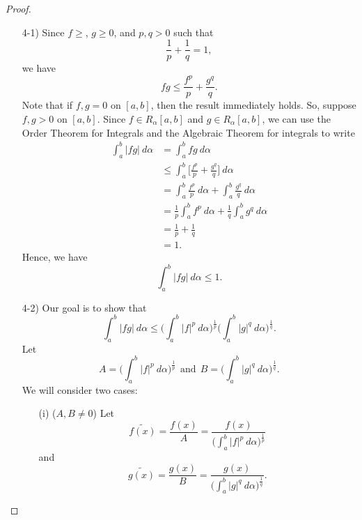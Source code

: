 \documentclass[a4paper]{article}
\begin{document}
\begin{proof}
\begin{enumerate}
    \item[4-1)] Since \( f \geq  \), \( g \geq 0  \), and \( p,q > 0  \) such that 
        \[  \frac{ 1 }{ p }  + \frac{ 1 }{ q }  = 1,  \]
        we have 
        \[  fg \leq \frac{ f^{p} }{ p  }  + \frac{ g^{q} }{ q }. \]
        Note that if \( f, g = 0  \) on \( [a,b] \), then the result immediately holds. So, suppose \( f,g > 0  \) on \( [a,b] \).
        Since \( f \in {R}_{\alpha}[a,b] \) and \( g \in {R}_{\alpha}[a,b] \), we can use the Order Theorem for Integrals and the Algebraic Theorem for integrals to write
        \begin{align*}
            \int_{ a }^{ b }  | fg |    \ d \alpha &= \int_{ a }^{ b } fg  \ d \alpha \tag{\( fg > 0  \)} \\
            &\leq \int_{ a }^{ b } \Big[ \frac{ f^{p} }{ p }  + \frac{ g^{q} }{ q  } \Big] \ d \alpha \\
                                          &= \int_{ a }^{ b }  \frac{ f^{p} }{ p }  \ d \alpha + \int_{ a }^{ b }  \frac{ g^{q} }{ q }  \ d \alpha  \\
                                          &= \frac{ 1 }{ p }  \int_{ a }^{ b } f^{p}   \ d \alpha + \frac{ 1 }{ q }  \int_{ a }^{ b } g^{q} \ d \alpha \\
                                        &= \frac{ 1 }{ p } + \frac{ 1 }{ q } \\ 
                                        &= 1.
        \end{align*}
        Hence, we have 
        \[  \int_{ a }^{ b } | fg |    \ d \alpha \leq 1.  \]
    \item[4-2)] Our goal is to show that 
\[  \int_{ a }^{ b }  | fg |   \ d \alpha \leq \Big(  \int_{ a }^{ b }  | f |^{p} \ d \alpha \Big)^{\frac{ 1 }{ p } } \Big(  \int_{ a }^{ b }  | g |^{q} \ d \alpha \Big)^{\frac{ 1 }{ q } }. \]
Let 
\[  A = \Big(  \int_{ a }^{ b }  | f |^{p} \ d \alpha \Big)^{\frac{ 1 }{ p } } \ \ \text{and} \ \ B = \Big(  \int_{ a }^{ b }  |g |^{q} \ d \alpha \Big)^{\frac{ 1 }{ q } }.  \]
We will consider two cases:
\begin{enumerate}
    \item[(i)] (\( A,B \neq 0  \)) Let 
        \[  \tilde{f(x)} = \frac{ f(x) }{ A  } = \frac{ f(x) }{  \Big(  \int_{ a }^{ b }  | f |^{p}  \ d \alpha \Big)^{\frac{ 1 }{ p }} }  \]
        and
        \[  \tilde{g(x)} = \frac{ g(x) }{  B  }  = \frac{ g(x) }{  \Big(  \int_{ a }^{ b }  | g |^{q} \ d \alpha \Big)^{\frac{ 1 }{ q } } }.  \]

\end{enumerate}
\end{enumerate}
\end{proof}
\end{document}
